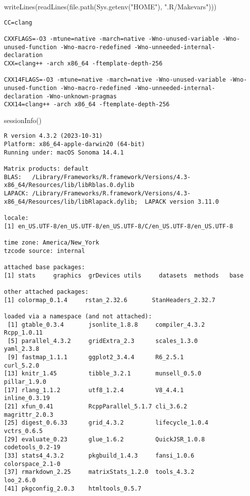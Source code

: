 \documentclass[
  letterpaper,
  DIV=11,
  numbers=noendperiod]{scrartcl}
\newenvironment{Shaded}{\begin{snugshade}}{\end{snugshade}}
\newcommand{\FunctionTok}[1]{\textcolor[rgb]{0.28,0.35,0.67}{#1}}
\newcommand{\NormalTok}[1]{\textcolor[rgb]{0.00,0.23,0.31}{#1}}
\newcommand{\StringTok}[1]{\textcolor[rgb]{0.13,0.47,0.30}{#1}}
\begin{document}
\begin{Shaded}
\begin{Highlighting}[]
\FunctionTok{writeLines}\NormalTok{(}\FunctionTok{readLines}\NormalTok{(}\FunctionTok{file.path}\NormalTok{(}\FunctionTok{Sys.getenv}\NormalTok{(}\StringTok{"HOME"}\NormalTok{), }\StringTok{".R/Makevars"}\NormalTok{)))}
\end{Highlighting}
\end{Shaded}

\begin{verbatim}
CC=clang

CXXFLAGS=-O3 -mtune=native -march=native -Wno-unused-variable -Wno-unused-function -Wno-macro-redefined -Wno-unneeded-internal-declaration
CXX=clang++ -arch x86_64 -ftemplate-depth-256

CXX14FLAGS=-O3 -mtune=native -march=native -Wno-unused-variable -Wno-unused-function -Wno-macro-redefined -Wno-unneeded-internal-declaration -Wno-unknown-pragmas
CXX14=clang++ -arch x86_64 -ftemplate-depth-256
\end{verbatim}

\begin{Shaded}
\begin{Highlighting}[]
\FunctionTok{sessionInfo}\NormalTok{()}
\end{Highlighting}
\end{Shaded}

\begin{verbatim}
R version 4.3.2 (2023-10-31)
Platform: x86_64-apple-darwin20 (64-bit)
Running under: macOS Sonoma 14.4.1

Matrix products: default
BLAS:   /Library/Frameworks/R.framework/Versions/4.3-x86_64/Resources/lib/libRblas.0.dylib 
LAPACK: /Library/Frameworks/R.framework/Versions/4.3-x86_64/Resources/lib/libRlapack.dylib;  LAPACK version 3.11.0

locale:
[1] en_US.UTF-8/en_US.UTF-8/en_US.UTF-8/C/en_US.UTF-8/en_US.UTF-8

time zone: America/New_York
tzcode source: internal

attached base packages:
[1] stats     graphics  grDevices utils     datasets  methods   base     

other attached packages:
[1] colormap_0.1.4     rstan_2.32.6       StanHeaders_2.32.7

loaded via a namespace (and not attached):
 [1] gtable_0.3.4       jsonlite_1.8.8     compiler_4.3.2     Rcpp_1.0.11       
 [5] parallel_4.3.2     gridExtra_2.3      scales_1.3.0       yaml_2.3.8        
 [9] fastmap_1.1.1      ggplot2_3.4.4      R6_2.5.1           curl_5.2.0        
[13] knitr_1.45         tibble_3.2.1       munsell_0.5.0      pillar_1.9.0      
[17] rlang_1.1.2        utf8_1.2.4         V8_4.4.1           inline_0.3.19     
[21] xfun_0.41          RcppParallel_5.1.7 cli_3.6.2          magrittr_2.0.3    
[25] digest_0.6.33      grid_4.3.2         lifecycle_1.0.4    vctrs_0.6.5       
[29] evaluate_0.23      glue_1.6.2         QuickJSR_1.0.8     codetools_0.2-19  
[33] stats4_4.3.2       pkgbuild_1.4.3     fansi_1.0.6        colorspace_2.1-0  
[37] rmarkdown_2.25     matrixStats_1.2.0  tools_4.3.2        loo_2.6.0         
[41] pkgconfig_2.0.3    htmltools_0.5.7   
\end{verbatim}
\end{document}
